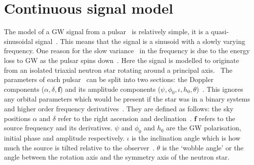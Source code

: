\section{\label{searchcw:model}Continuous signal model}

The model of a \gls{GW} signal from a pulsar~ is relatively simple, it is a
quasi-sinusoidal signal~. This means that the signal is a sinusoid with a slowly
varying frequency. One reason for the slow variance~ in the frequency is due to the energy
loss to \gls{GW} as the pulsar spins down~. Here the signal is modelled to
originate from an isolated triaxial neutron star rotating around a principal
axis.~ The parameters of each pulsar~ can be split into two sections: the Doppler components
($\alpha,\delta,{\bm f}$) and its amplitude components ($\psi,\phi_0, \iota,
h_0, \theta$)~. This ignores any orbital parameters which would be present if the
star was in a binary systems and higher order frequency derivatives~. They are defined as follows: the sky positions
$\alpha$ and $\delta$ refer to the right ascension and declination~.  ${\bm f}$ refers to
the source frequency and its derivatives.   $\psi$ and
$\phi_0$ and $h_0 $ are the \gls{GW} polarisation, initial phase and amplitude
respectively.  $\iota$ is the inclination angle which is how much the source is
tilted relative to the observer~.
$\theta$ is the `wobble angle' or the angle between the rotation axis and the
symmetry axis of the neutron star.

